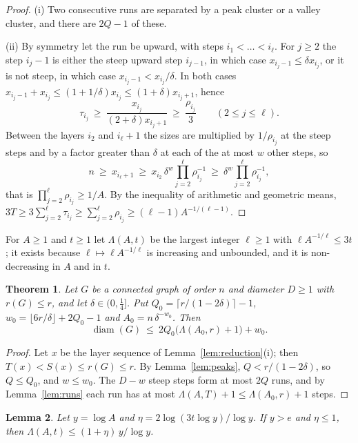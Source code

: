 \documentclass[11pt]{amsart}
\newtheorem{theorem}{Theorem}[section]
\newtheorem{lemma}[theorem]{Lemma}
\theoremstyle{definition}
\theoremstyle{remark}
\newcommand{\diam}{\operatorname{diam}}
\begin{document}
\begin{proof}
(i) Two consecutive runs are separated by a peak cluster or a valley cluster, and there are $2Q-1$ of these.

(ii) By symmetry let the run be upward, with steps $i_1<\dots<i_\ell$.
For $j\ge2$ the step $i_j-1$ is either the steep upward step $i_{j-1}$, in which case $x_{i_j-1}\le\delta x_{i_j}$, or it is not steep, in which case $x_{i_j-1}<x_{i_j}/\delta$.
In both cases $x_{i_j-1}+x_{i_j}\le(1+1/\delta)x_{i_j}\le(1+\delta)x_{i_j+1}$, hence
\[
\tau_{i_j}\ \ge\ \frac{x_{i_j}}{(2+\delta)x_{i_j+1}}\ \ge\ \frac{\rho_{i_j}}3\qquad(2\le j\le\ell).
\]
Between the layers $i_2$ and $i_\ell+1$ the sizes are multiplied by $1/\rho_{i_j}$ at the steep steps and by a factor greater than $\delta$ at each of the at most $w$ other steps, so
\[
n\ \ge\ x_{i_\ell+1}\ \ge\ x_{i_2}\,\delta^{w}\prod_{j=2}^{\ell}\rho_{i_j}^{-1}\ \ge\ \delta^{w}\prod_{j=2}^{\ell}\rho_{i_j}^{-1},
\]
that is $\prod_{j=2}^\ell\rho_{i_j}\ge1/A$. By the inequality of arithmetic and geometric means,
$3T\ge3\sum_{j=2}^{\ell}\tau_{i_j}\ge\sum_{j=2}^\ell\rho_{i_j}\ge(\ell-1)A^{-1/(\ell-1)}$.
\end{proof}

For $A\ge1$ and $t\ge1$ let $\Lambda(A,t)$ be the largest integer $\ell\ge1$ with $\ell A^{-1/\ell}\le3t$; it exists because $\ell\mapsto\ell A^{-1/\ell}$ is increasing and unbounded, and it is non-decreasing in $A$ and in $t$.

\begin{theorem}\label{thm:upper}
Let $G$ be a connected graph of order $n$ and diameter $D\ge1$ with $r(G)\le r$, and let $\delta\in(0,\frac14]$.
Put $Q_0=\lceil r/(1-2\delta)\rceil-1$, $w_0=\lfloor6r/\delta\rfloor+2Q_0-1$ and $A_0=n\,\delta^{-w_0}$. Then
\[
\diam(G)\ \le\ 2Q_0\bigl(\Lambda(A_0,r)+1\bigr)+w_0 .
\]
\end{theorem}

\begin{proof}
Let $x$ be the layer sequence of Lemma~\ref{lem:reduction}(i); then $T(x)<S(x)\le r(G)\le r$.
By Lemma~\ref{lem:peaks}, $Q<r/(1-2\delta)$, so $Q\le Q_0$, and $w\le w_0$.
The $D-w$ steep steps form at most $2Q$ runs, and by Lemma~\ref{lem:runs} each run has at most $\Lambda(A,T)+1\le\Lambda(A_0,r)+1$ steps.
\end{proof}

\begin{lemma}\label{lem:lambda}
Let $y=\log A$ and $\eta=2\log(3t\log y)/\log y$. If $y>e$ and $\eta\le1$, then $\Lambda(A,t)\le(1+\eta)\,y/\log y$.
\end{lemma}
\end{document}
